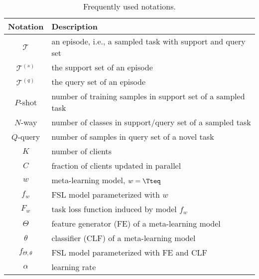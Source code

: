 \begin{table}[htb]
\caption{Frequently used notations.}
\vspace{-3pt}
\begin{tabular}{c|l}
\toprule  
\textbf{Notation}  & \textbf{Description}  \\ \toprule
$\mathcal{T}$ & an episode, i.e., a sampled task with support and query set  \\
$\mathcal{T}^{(s)}$ & the support set of an episode \\
$\mathcal{T}^{(q)}$ & the query set of an episode \\
$P$-shot & number of training samples in support set of a sampled task \\ 
$N$-way & number of classes in support/query set of a sampled task \\
$Q$-query & number of samples in query set of a novel task \\ 
$K$ & number of clients \\ 
$C$ & fraction of clients updated in parallel \\
$w$ & meta-learning model, $w=\Tteq$ \\
$f_{w}$ & FSL model parameterized with $w$   \\
$F_{w}$ & task loss function induced by model $f_{w}$ \\
$\Theta$ & feature generator (FE) of a meta-learning model \\
$\theta$ & classifier (CLF) of a meta-learning model \\
$f_{\Theta,\theta}$ & FSL model parameterized with FE and CLF   \\
$\alpha$ & learning rate \\
\bottomrule
\end{tabular}
\label{tab:freq_notation}
\end{table}